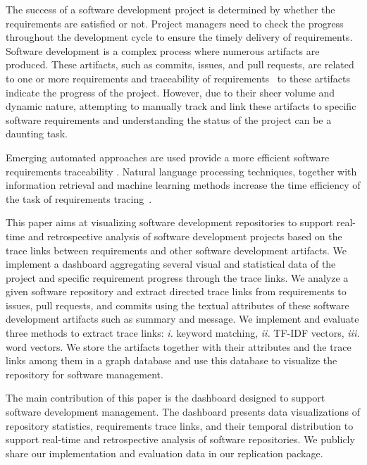 %
The success of a software development project is determined by whether the requirements are satisfied or not. Project managers need to check the progress throughout the development cycle to ensure the timely delivery of requirements. Software development is a complex process where numerous artifacts are produced. These artifacts, such as commits, issues, and pull requests, are related to one or more requirements and traceability of requirements~\cite{gotel-1994} to these artifacts indicate the progress of the project. However, due to their sheer volume and dynamic nature, attempting to manually track and link these artifacts to specific software requirements and understanding the status of the project can be a daunting task.

%
Emerging automated approaches are used provide a more efficient software requirements traceability \cite{cleland-huang-2007,mills-2017,VANOOSTEN2023107226,bonner-2023,deen-2023}. Natural language processing techniques, together with information retrieval and machine learning methods increase the time efficiency of the task of requirements tracing~\cite{cleland-huang-2007}.

%
This paper aims at visualizing software development repositories to support real-time and retrospective analysis of software development projects based on the trace links between requirements and other software development artifacts. We implement a dashboard aggregating several visual and statistical data of the project and specific requirement progress through the trace links. We analyze a given software repository and extract directed trace links from requirements to issues, pull requests, and commits using the textual attributes of these software development artifacts such as summary and message. We implement and evaluate three methods to extract trace links: \emph{i.} keyword matching, \emph{ii.} TF-IDF vectors, \emph{iii.} word vectors. We store the artifacts together with their attributes and the trace links among them in a graph database and use this database to visualize the repository for software management.

The main contribution of this paper is the dashboard designed to support software development management. The dashboard presents data visualizations of repository statistics, requirements trace links, and their temporal distribution to support real-time and retrospective analysis of software repositories. We publicly share our implementation and evaluation data in our replication package.















